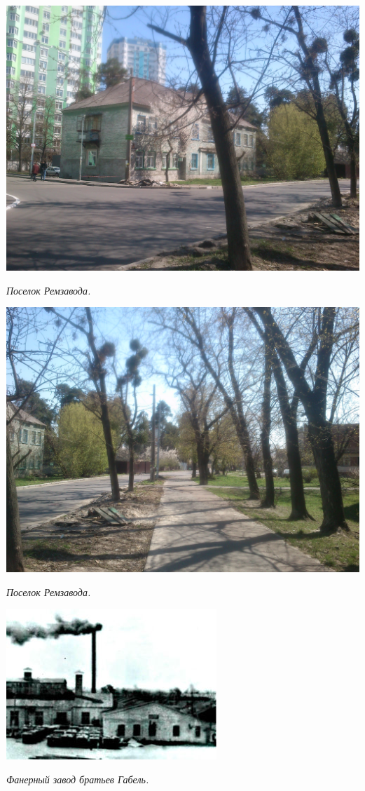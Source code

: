 \begin{center}
\includegraphics[width=\linewidth]{lpix/DSC_0013.JPG}

\textit{Поселок Ремзавода.}
\end{center}


\begin{center}
\includegraphics[width=\linewidth]{lpix/DSC_0014.JPG}

\textit{Поселок Ремзавода.}
\end{center}


\begin{center}
\includegraphics[width=0.95\linewidth]{lpix/gabel.jpg}

\textit{Фанерный завод братьев Габель.}
\end{center}


